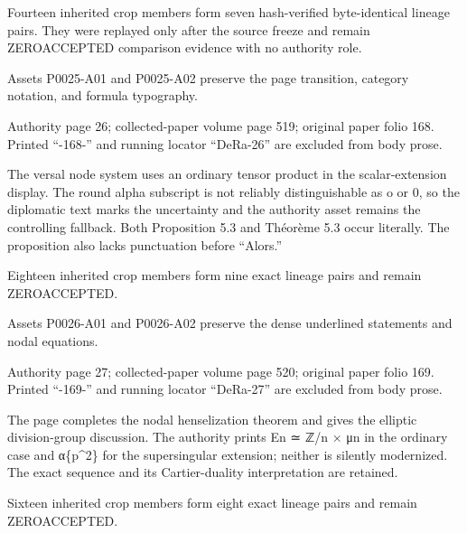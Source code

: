 \documentclass[11pt,a4paper]{article}
\begin{document}
Fourteen inherited crop members form seven hash-verified byte-identical lineage pairs. They were replayed only after the source freeze and remain ZERO\textunderscore{}ACCEPTED comparison evidence with no authority role.

Assets P0025-A01 and P0025-A02 preserve the page transition, category notation, and formula typography.


\par\medskip
\hypertarget{D018-P0026}{}
\par\smallskip
Authority page 26; collected-paper volume page 519; original paper folio 168. Printed “-168-” and running locator “DeRa-26” are excluded from body prose.

The versal node system uses an ordinary tensor product in the scalar-extension display. The round alpha subscript is not reliably distinguishable as o or 0, so the diplomatic text marks the uncertainty and the authority asset remains the controlling fallback. Both Proposition 5.3 and Théorème 5.3 occur literally. The proposition also lacks punctuation before “Alors.”

Eighteen inherited crop members form nine exact lineage pairs and remain ZERO\textunderscore{}ACCEPTED.

Assets P0026-A01 and P0026-A02 preserve the dense underlined statements and nodal equations.


\par\medskip
\hypertarget{D018-P0027}{}
\par\smallskip
Authority page 27; collected-paper volume page 520; original paper folio 169. Printed “-169-” and running locator “DeRa-27” are excluded from body prose.

The page completes the nodal henselization theorem and gives the elliptic division-group discussion. The authority prints E\textunderscore{}n ≃ ℤ/n × μ\textunderscore{}n in the ordinary case and α\textunderscore{}\{p\textasciicircum{}2\} for the supersingular extension; neither is silently modernized. The exact sequence and its Cartier-duality interpretation are retained.

Sixteen inherited crop members form eight exact lineage pairs and remain ZERO\textunderscore{}ACCEPTED.
\end{document}
